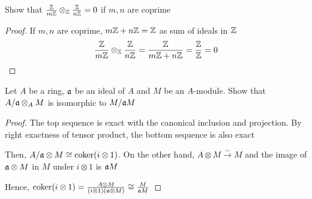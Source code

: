 
\begin{problem}
	Show that $\frac{\mathbb{Z}}{m\mathbb{Z}} \otimes_{\mathbb{Z}} \frac{\mathbb{Z}}{n\mathbb{Z}} = 0$ if $m, n$ are coprime
\end{problem}

\begin{proof}
	If $m, n$ are coprime, $m \mathbb{Z} + n \mathbb{Z} = \mathbb{Z}$ as sum of ideals in $\mathbb{Z}$
	$$
		\frac{\mathbb{Z}}{m\mathbb{Z}} \otimes_{\mathbb{Z}} \frac{\mathbb{Z}}{n\mathbb{Z}} = \frac{\mathbb{Z}}{m \mathbb{Z} + n \mathbb{Z}} = \frac{\mathbb{Z}}{\mathbb{Z}} = 0
	$$
\end{proof}

\begin{problem}
	Let $A$ be a ring, $\mathfrak{a}$ be an ideal of $A$ and $M$ be an $A$-module. Show that $A / \mathfrak{a} \otimes_A M$ is isomorphic to $M / \mathfrak{a} M$
\end{problem}

\begin{proof}
	The top sequence is exact with the canonical inclusion and projection. By right exactness of tensor product, the bottom sequence is also exact
	
	\begin{center}
	\end{center}
	
	Then, $A / \mathfrak{a} \otimes M \cong \operatorname{coker} (i \otimes 1)$. On the other hand, $A \otimes M \xrightarrow{\sim}  M$ and the image of $\mathfrak{a} \otimes M$ in $M$ under $i \otimes 1$ is $\mathfrak{a}M$
	\begin{center}
	\end{center}
	
	Hence, $\operatorname{coker} (i \otimes 1) = \frac{A \otimes M}{(i \otimes 1)(\mathfrak{a} \otimes M)} \cong \frac{M}{\mathfrak{a} M}$
\end{proof}


